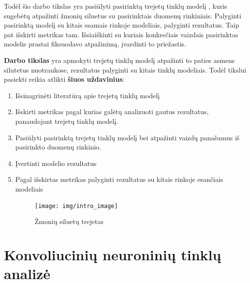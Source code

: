 \documentclass{VUMIFPSkursinis}
\DeclareRobustCommand{\[}{\begin{equation}}
\DeclareRobustCommand{\]}{\end{equation}}
\begin{document}
\newline
Todėl šio darbo tikslas yra pasiūlyti pasirinktą trejetų tinklų modelį \cite{Aerial_image_similarity}, kuris sugebėtų atpažinti žmonių siluetus su pasirinktais duomenų rinkiniais. Palyginti pasirinktą modelį su kitais esamais rinkoje modeliais, palyginti rezultatus. Taip pat išskirti metrikas tam. Išsiaiškinti su kuriais konkrečiais vaizdais pasirinktas modelis prastai fiksuodavo atpažinimą, įvardinti to priežastis.
\pagebreak
 
\textbf{Darbo tikslas} yra apmokyti trejetų tinklų modelį atpažinti to paties asmens silutetus nuotraukose, rezultatus palyginti su kitais tinklų modeliais. Todėl tikslui pasiekti reikia atlikti \textbf{šiuos uždavinius}:
\begin{enumerate}
\item{Išsinagrinėti literatūrą apie trejetų tinklų modelį}
\item{Išskirti metrikas pagal kurias galėtų analizuoti gautus rezultatus, panaudojant trejetų tinklų modelį.}
\item{Pasiūlyti pasirinktą trejetų tinklų modelį bei atpažinti vaizdų panašumus iš pasirinkto duomenų rinkinio.}
\item{Įvertinti modelio rezultatus}
\item{Pagal išskirtas metrikas palyginti rezultatus su kitais rinkoje esančiais modeliais}

\begin{figure}[H]
\centering
\texttt{[image: img/intro\_image]}
\caption{Žmonių siluetų trejetas} %
\label{img:mlp}
\end{figure}

\end{enumerate}

\pagebreak
\section{Konvoliucinių neuroninių tinklų analizė}
\end{document}
